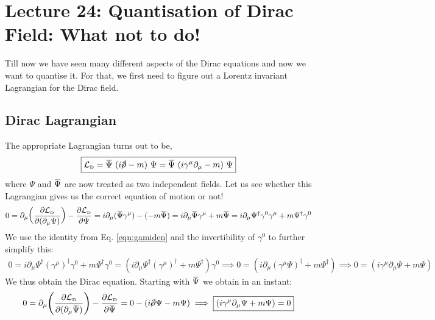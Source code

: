 \section*{Lecture 24: Quantisation of Dirac Field: What not to do!}
Till now we have seen many different aspects of the Dirac equations and now we want to quantise it. For that, we first need to figure out a Lorentz invariant Lagrangian for the Dirac field.
\subsection{Dirac Lagrangian} 
The appropriate Lagrangian turns out to be,
$$\boxed{\SL\tund{D} = \dadj{\Psi}\ (i \gsl{\partial} - m)\ \Psi = \dadj{\Psi}\ (i \gamma^\mu \partial_\mu - m)\ \Psi}$$
where $\Psi$ and $\dadj{\Psi}$ are now treated as two independent fields. Let us see whether this Lagrangian gives us the correct equation of motion or not! 
   \begin{align*}
    0 = \partial_\mu \qty(\pdv{\SL\tund{D}}{(\partial_\mu \Psi)}) - \pdv{\SL\tund{D}}{\Psi}=i\partial_\mu( \dadj{\Psi} \gamma^\mu) - (-m\dadj{\Psi})=i \partial_\mu \dadj{\Psi}\gamma^\mu +m \dadj{\Psi} &=i\partial_\mu \Psi^\dagger \gamma^0\gamma^\mu +m \Psi^\dagger \gamma^0\\
   \end{align*}
   We use the identity from Eq. \ref{eqn:gamiden} and the invertibility of $\gamma^0$ to further simplify this:
   \begin{align*}
    0=i\partial_\mu \Psi^\dagger (\gamma^\mu)^\dagger \gamma^0 +m \Psi^\dagger \gamma^0=(i\partial_\mu \Psi^\dagger (\gamma^\mu)^\dagger +m \Psi^\dagger )\gamma^0\implies 0=(i\partial_\mu  (\gamma^\mu \Psi)^\dagger +m \Psi^\dagger )\implies \boxed{0=(i\gamma^\mu\partial_\mu \Psi +m \Psi)}
   \end{align*}
   We thus obtain the Dirac equation. Starting with $\dadj{\Psi}$ we obtain in an instant:
%
   \begin{align*}
     0 =\partial_\mu \qty(\pdv{\SL\tund{D}}{(\partial_\mu \dadj{\Psi})}) - \pdv{\SL\tund{D}}{\dadj{\Psi}}= 0 - (i \gsl{\partial}\Psi-m\Psi)\implies \boxed{(i\gamma^\mu\partial_\mu \Psi +m \Psi)=0}
   \end{align*}
